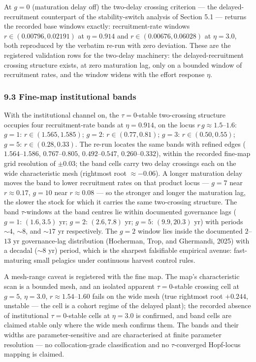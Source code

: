 \documentclass[11pt]{article}
\begin{document}
At \(g = 0\) (maturation delay off) the two-delay crossing criterion ---
the delayed-recruitment counterpart of the stability-switch analysis of
Section 5.1 --- returns the recorded base windows exactly:
recruitment-rate windows \(r \in (0.00796, 0.02191)\) at
\(\eta = 0.914\) and \(r \in (0.00676, 0.06028)\) at \(\eta = 3.0\),
both reproduced by the verbatim re-run with zero deviation. These are
the registered validation rows for the two-delay machinery: the
delayed-recruitment crossing structure exists, at zero maturation lag,
only on a bounded window of recruitment rates, and the window widens
with the effort response \(\eta\).

\subsubsection{9.3 Fine-map institutional
bands}\label{fine-map-institutional-bands}

With the institutional channel on, the \(\tau = 0\)-stable two-crossing
structure occupies four recruitment-rate bands at \(\eta = 0.914\), on
the locus \(r\,g \approx 1.5\)--\(1.6\): \(g = 1\):
\(r \in (1.565, 1.585)\); \(g = 2\): \(r \in (0.77, 0.81)\); \(g = 3\):
\(r \in (0.50, 0.55)\); \(g = 5\): \(r \in (0.28, 0.33)\). The re-run
locates the same bands with refined edges (\(1.564\)--\(1.586\),
\(0.767\)--\(0.805\), \(0.492\)--\(0.547\), \(0.260\)--\(0.332\)),
within the recorded fine-map grid resolution of \(\pm 0.03\); the band
cells carry two delay crossings each on the wide characteristic mesh
(rightmost root \(\approx -0.06\)). A longer maturation delay moves the
band to lower recruitment rates on that product locus --- \(g=7\) near
\(r\approx0.17\), \(g=10\) near \(r\approx0.08\) --- so the stronger and
longer the maturation lag, the slower the stock for which it carries the
same two-crossing structure. The band \(\tau\)-windows at the band
centres lie within documented governance lags (\(g=1\): \((1.6,3.5)\)
yr; \(g=2\): \((2.6,7.8)\) yr; \(g=5\): \((9.9,20.3)\) yr) with periods
\(\sim4\), \(\sim8\), and \(\sim17\) yr respectively. The \(g=2\) window
lies inside the documented \(2\)--\(13\) yr governance-lag distribution
(Hocherman, Trop, and Ghermandi, 2025) with a decadal (\(\sim8\) yr)
period, which is the sharpest falsifiable empirical avenue:
fast-maturing small pelagics under continuous harvest control rules.

A mesh-range caveat is registered with the fine map. The map's
characteristic scan is a bounded mesh, and an isolated apparent
\(\tau = 0\)-stable crossing cell at \(g = 5\), \(\eta = 3.0\),
\(r \approx 1.54\)--\(1.60\) fails on the wide mesh (true rightmost root
\(+0.244\), unstable --- the cell is a cohort regime of the delayed
plant); the recorded absence of institutional \(\tau = 0\)-stable cells
at \(\eta = 3.0\) is confirmed, and band cells are claimed stable only
where the wide mesh confirms them. The bands and their widths are
parameter-sensitive and are characterised at finite parameter resolution
--- no collocation-grade classification and no \(\tau\)-converged
Hopf-locus mapping is claimed.
\end{document}
